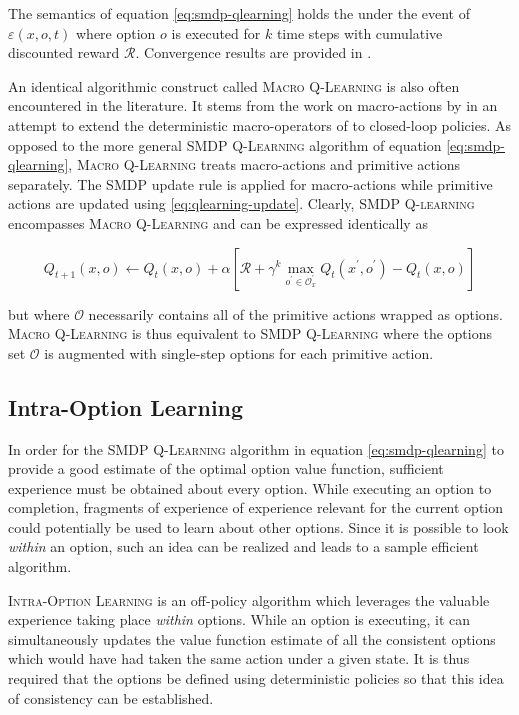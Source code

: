The semantics of equation \ref{eq:smdp-qlearning} holds the under the event of
$\varepsilon(x, o, t)$ where option $o$ is executed for $k$ time steps with cumulative
discounted reward $\mathcal{R}$. Convergence results are provided in \cite{Parr1998}.

An identical algorithmic construct called \textsc{Macro Q-Learning} is also often
encountered in the literature. It stems from the work on macro-actions by
\cite{Mcgovern1997} in an attempt to extend the deterministic macro-operators of
\cite{Korf1985} to closed-loop policies. As opposed to the more general \textsc{SMDP Q-Learning} algorithm of equation \ref{eq:smdp-qlearning}, \textsc{Macro Q-Learning} treats macro-actions and primitive actions separately. The SMDP update rule is applied for macro-actions
while primitive actions are updated using \ref{eq:qlearning-update}. Clearly, \textsc{SMDP Q-learning} encompasses \textsc{Macro Q-Learning} and can be expressed identically as

\begin{equation}
Q_{t+1}(x, o) \leftarrow Q_{t}(x, o) + \alpha \left[ \mathcal{R} + \gamma^k
\max_{o^\prime \in \mathcal{O}_x^\prime} Q_{t}(x^\prime, o^\prime) -
Q_t(x, o) \right]
\end{equation}

but where $\mathcal{O}$ necessarily contains all of the primitive actions wrapped as options. \textsc{Macro Q-Learning} is thus equivalent to \textsc{SMDP Q-Learning} where the
options set $\mathcal{O}$ is augmented with single-step options for each primitive
action.

\subsection{Intra-Option Learning}

In order for the \textsc{SMDP Q-Learning} algorithm in equation \ref{eq:smdp-qlearning} to provide a
good estimate of the optimal option value function, sufficient experience must be
obtained about every option. While executing an option to completion, fragments of experience of experience relevant for the current option could potentially be used to learn about other options. Since  it is possible to look \textit{within} an option, such an idea can be realized and leads to a sample efficient algorithm.

\textsc{Intra-Option Learning} is an off-policy algorithm which leverages the valuable
experience taking place \textit{within} options. While an option is executing, it can simultaneously
updates the value function estimate of all the consistent options which would have had
taken the same action under a given state. It is thus required that the options be
defined using deterministic policies so that this idea of consistency can be established. 

